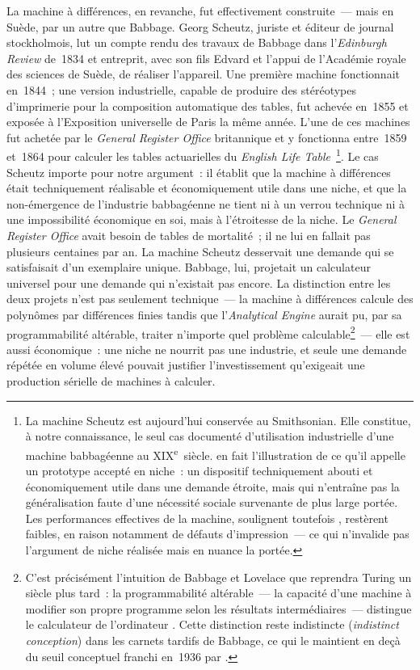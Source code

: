 La machine à différences, en revanche, fut effectivement construite~--- mais en Suède, par un autre que Babbage. Georg Scheutz, juriste et éditeur de journal stockholmois, lut un compte rendu des travaux de Babbage dans l'\emph{Edinburgh Review} de~1834 et entreprit, avec son fils Edvard et l'appui de l'Académie royale des sciences de Suède, de réaliser l'appareil. Une première machine fonctionnait en~1844~; une version industrielle, capable de produire des stéréotypes d'imprimerie pour la composition automatique des tables, fut achevée en~1855 et exposée à l'Exposition universelle de Paris la même année. L'une de ces machines fut achetée par le \emph{General Register Office} britannique et y fonctionna entre~1859 et~1864 pour calculer les tables actuarielles du \emph{English Life Table}~\parencite[ch.~1]{goldstine_computer_1972}\footnote{La machine Scheutz est aujourd'hui conservée au Smithsonian. Elle constitue, à notre connaissance, le seul cas documenté d'utilisation industrielle d'une machine babbagéenne au XIX\textsuperscript{e}~siècle. \textcite{winston_media_1998} en fait l'illustration de ce qu'il appelle un \og prototype accepté en niche\fg{}~: un dispositif techniquement abouti et économiquement utile dans une demande étroite, mais qui n'entraîne pas la généralisation faute d'une nécessité sociale survenante de plus large portée. Les performances effectives de la machine, soulignent toutefois \textcite[p.~328]{warwick_laboratory_1995}, restèrent faibles, en raison notamment de défauts d'impression~--- ce qui n'invalide pas l'argument de niche réalisée mais en nuance la portée.}. %
Le cas Scheutz importe pour notre argument~: il établit que la machine à différences était techniquement réalisable et économiquement utile dans une niche, et que la non-émergence de l'industrie babbagéenne ne tient ni à un verrou technique ni à une impossibilité économique en soi, mais à l'étroitesse de la niche. Le \emph{General Register Office} avait besoin de tables de mortalité~; il ne lui en fallait pas plusieurs centaines par an. La machine Scheutz desservait une demande qui se satisfaisait d'un exemplaire unique. Babbage, lui, projetait un calculateur universel pour une demande qui n'existait pas encore. La distinction entre les deux projets n'est pas seulement technique~--- la machine à différences calcule des polynômes par différences finies tandis que l'\emph{Analytical Engine} aurait pu, par sa programmabilité altérable, traiter n'importe quel problème calculable\footnote{C'est précisément l'intuition de Babbage et Lovelace que reprendra Turing un siècle plus tard~: la programmabilité altérable~--- la capacité d'une machine à modifier son propre programme selon les résultats intermédiaires~--- distingue le calculateur de l'ordinateur \parencite[ch.~8]{winston_media_1998}. Cette distinction reste \og indistincte\fg{} (\emph{indistinct conception}) dans les carnets tardifs de Babbage, ce qui le maintient en deçà du seuil conceptuel franchi en~1936 par \textcite{turing_computable_1937}.}~--- elle est aussi économique~: une niche ne nourrit pas une industrie, et seule une demande répétée en volume élevé pouvait justifier l'investissement qu'exigeait une production sérielle de machines à calculer.

